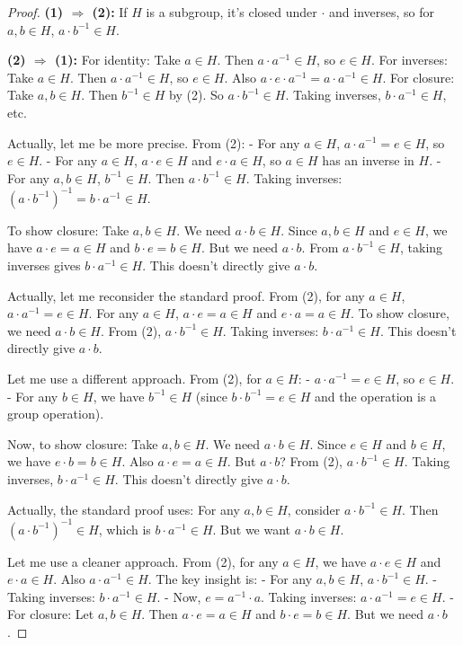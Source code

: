 \begin{proof}
\textbf{(1) $\Rightarrow$ (2):} If $H$ is a subgroup, it's closed under $\cdot$ and inverses, so for $a, b \in H$, $a \cdot b^{-1} \in H$.

\textbf{(2) $\Rightarrow$ (1):} For identity: Take $a \in H$. Then $a \cdot a^{-1} \in H$, so $e \in H$. For inverses: Take $a \in H$. Then $a \cdot a^{-1} \in H$, so $e \in H$. Also $a \cdot e \cdot a^{-1} = a \cdot a^{-1} \in H$. For closure: Take $a, b \in H$. Then $b^{-1} \in H$ by (2). So $a \cdot b^{-1} \in H$. Taking inverses, $b \cdot a^{-1} \in H$, etc.

Actually, let me be more precise. From (2):
- For any $a \in H$, $a \cdot a^{-1} = e \in H$, so $e \in H$.
- For any $a \in H$, $a \cdot e \in H$ and $e \cdot a \in H$, so $a \in H$ has an inverse in $H$.
- For any $a, b \in H$, $b^{-1} \in H$. Then $a \cdot b^{-1} \in H$. Taking inverses: $(a \cdot b^{-1})^{-1} = b \cdot a^{-1} \in H$.

To show closure: Take $a, b \in H$. We need $a \cdot b \in H$. Since $a, b \in H$ and $e \in H$, we have $a \cdot e = a \in H$ and $b \cdot e = b \in H$. But we need $a \cdot b$. From $a \cdot b^{-1} \in H$, taking inverses gives $b \cdot a^{-1} \in H$. This doesn't directly give $a \cdot b$.

Actually, let me reconsider the standard proof. From (2), for any $a \in H$, $a \cdot a^{-1} = e \in H$. For any $a \in H$, $a \cdot e = a \in H$ and $e \cdot a = a \in H$. To show closure, we need $a \cdot b \in H$. From (2), $a \cdot b^{-1} \in H$. Taking inverses: $b \cdot a^{-1} \in H$. This doesn't directly give $a \cdot b$.

Let me use a different approach. From (2), for $a \in H$:
- $a \cdot a^{-1} = e \in H$, so $e \in H$.
- For any $b \in H$, we have $b^{-1} \in H$ (since $b \cdot b^{-1} = e \in H$ and the operation is a group operation).

Now, to show closure: Take $a, b \in H$. We need $a \cdot b \in H$. Since $e \in H$ and $b \in H$, we have $e \cdot b = b \in H$. Also $a \cdot e = a \in H$. But $a \cdot b$? From (2), $a \cdot b^{-1} \in H$. Taking inverses, $b \cdot a^{-1} \in H$. This doesn't directly give $a \cdot b$.

Actually, the standard proof uses: For any $a, b \in H$, consider $a \cdot b^{-1} \in H$. Then $(a \cdot b^{-1})^{-1} \in H$, which is $b \cdot a^{-1} \in H$. But we want $a \cdot b \in H$.

Let me use a cleaner approach. From (2), for any $a \in H$, we have $a \cdot e \in H$ and $e \cdot a \in H$. Also $a \cdot a^{-1} \in H$. The key insight is:
- For any $a, b \in H$, $a \cdot b^{-1} \in H$.
- Taking inverses: $b \cdot a^{-1} \in H$.
- Now, $e = a^{-1} \cdot a$. Taking inverses: $a \cdot a^{-1} = e \in H$.
- For closure: Let $a, b \in H$. Then $a \cdot e = a \in H$ and $b \cdot e = b \in H$. But we need $a \cdot b$.


\end{proof}
